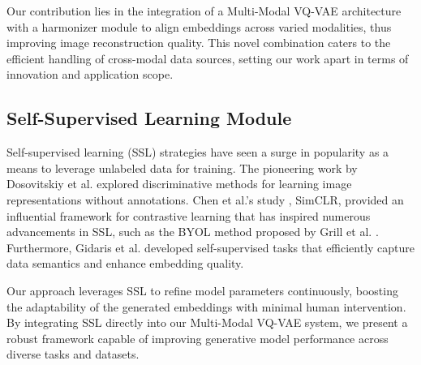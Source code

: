 Our contribution lies in the integration of a Multi-Modal VQ-VAE architecture with a harmonizer module to align embeddings across varied modalities, thus improving image reconstruction quality. This novel combination caters to the efficient handling of cross-modal data sources, setting our work apart in terms of innovation and application scope.

\subsection{Self-Supervised Learning Module}

Self-supervised learning (SSL) strategies have seen a surge in popularity as a means to leverage unlabeled data for training. The pioneering work by Dosovitskiy et al. \cite{dosovitskiy2015discriminative} explored discriminative methods for learning image representations without annotations. Chen et al.'s study \cite{chen2020simple}, SimCLR, provided an influential framework for contrastive learning that has inspired numerous advancements in SSL, such as the BYOL method proposed by Grill et al. \cite{grill2020bootstrap}. Furthermore, Gidaris et al. \cite{gidaris2018unsupervised} developed self-supervised tasks that efficiently capture data semantics and enhance embedding quality.

Our approach leverages SSL to refine model parameters continuously, boosting the adaptability of the generated embeddings with minimal human intervention. By integrating SSL directly into our Multi-Modal VQ-VAE system, we present a robust framework capable of improving generative model performance across diverse tasks and datasets.





